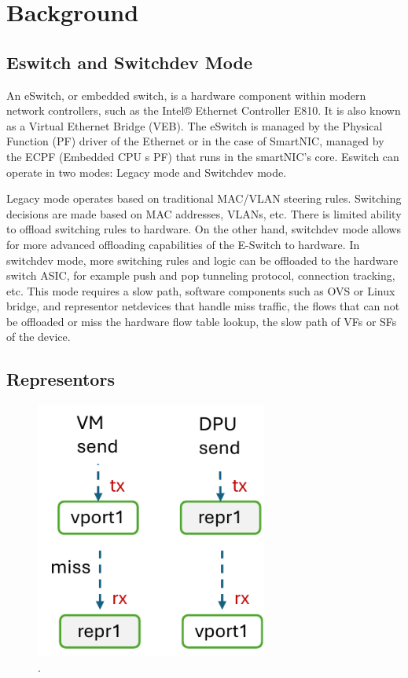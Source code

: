 \documentclass[letterpaper]{article}
\begin{document}
\section{Background}

\subsection{Eswitch and Switchdev Mode}
An eSwitch, or embedded switch, is a hardware component within modern network
controllers, such as the Intel® Ethernet Controller E810. It is also known as
a Virtual Ethernet Bridge (VEB). The eSwitch is managed by the Physical Function (PF)
driver of the Ethernet or in the case of SmartNIC, managed by the ECPF (Embedded CPU
s PF) that runs in the smartNIC's core. Eswitch can operate in two modes:
Legacy mode and Switchdev mode.

Legacy mode operates based on traditional MAC/VLAN steering rules. Switching
decisions are made based on MAC addresses, VLANs, etc. There is limited ability
to offload switching rules to hardware.
On the other hand, switchdev mode allows for more advanced offloading
capabilities of the E-Switch to hardware. In switchdev mode, more switching
rules and logic can be offloaded to the hardware switch ASIC, for example
push and pop tunneling protocol, connection tracking, etc.
This mode requires a slow path, software components such as OVS or
Linux bridge, and representor netdevices that handle miss traffic,
the flows that can not be offloaded or miss the hardware flow table
lookup, the slow path of VFs or SFs of the device.

\subsection{Representors}
\begin{figure}[h]
\includegraphics[width=3in]{pipe.pdf}
\caption{.}
\label{fig:arch}
\end{figure}
\end{document}
